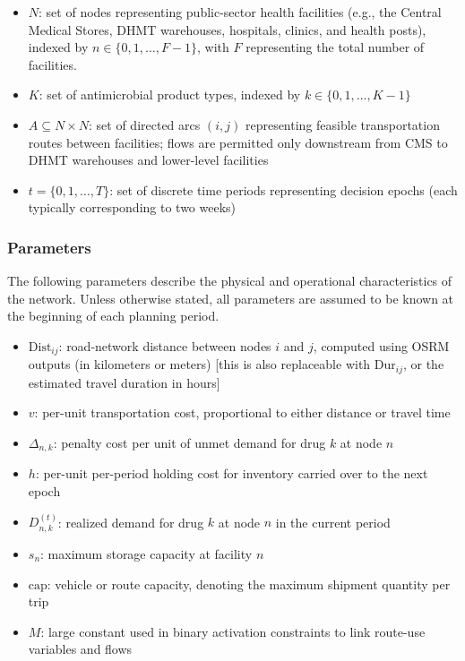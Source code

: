 \documentclass{article}
\begin{document}
\begin{itemize}
  \item $N$: set of nodes representing public-sector health facilities (e.g., the Central Medical Stores, DHMT warehouses, hospitals, clinics, and health posts), indexed by \(n \in \{0, 1, \dots, F-1\}\), with \(F\) representing the total number of facilities.
  \item $K$: set of antimicrobial product types, indexed by \(k \in \{0, 1, \dots, K-1\}\)
  \item $A \subseteq N \times N$: set of directed arcs \((i,j)\) representing feasible transportation routes between facilities; flows are permitted only downstream from CMS to DHMT warehouses and lower-level facilities
  \item $t = \{0, 1, \dots, T\}$: set of discrete time periods representing decision epochs (each typically corresponding to two weeks)
\end{itemize}

\subsubsection{Parameters}
\label{4.2.2}

The following parameters describe the physical and operational characteristics of the network.  
Unless otherwise stated, all parameters are assumed to be known at the beginning of each planning period.

\begin{itemize}
  \item $\text{Dist}_{ij}$: road-network distance between nodes \(i\) and \(j\), computed using OSRM outputs (in kilometers or meters) [this is also replaceable with $\text{Dur}_{ij}$, or the estimated travel duration in hours]
  \item $v$: per-unit transportation cost, proportional to either distance or travel time
  \item $\Delta_{n,k}$: penalty cost per unit of unmet demand for drug \(k\) at node \(n\)
  \item $h$: per-unit per-period holding cost for inventory carried over to the next epoch
  \item $D_{n,k}^{(t)}$: realized demand for drug \(k\) at node \(n\) in the current period
  \item $s_n$: maximum storage capacity at facility \(n\)
  \item $\text{cap}$: vehicle or route capacity, denoting the maximum shipment quantity per trip
  \item $M$: large constant used in binary activation constraints to link route-use variables and flows
\end{itemize}
\end{document}
